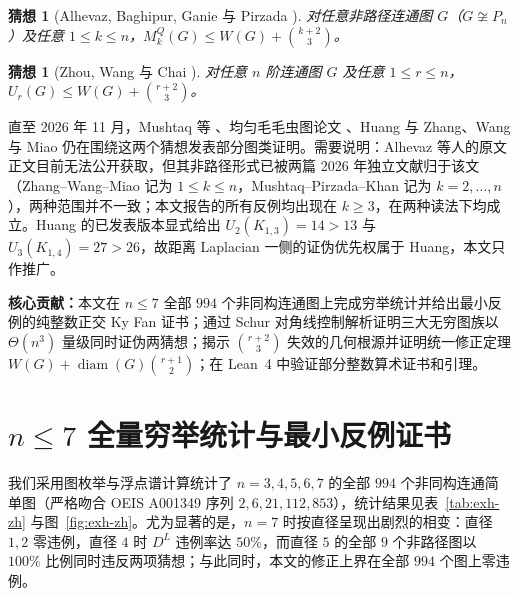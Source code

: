 \documentclass[11pt,a4paper]{article}
\newcommand{\takeaway}[2]{%
  \vspace{6pt}\noindent\colorbox{primary!8}{%
    \parbox{\dimexpr\linewidth-2\fboxsep\relax}{%
      \vspace{3pt}\textbf{\color{primary}#1：}\hspace{0.5em}#2\vspace{3pt}%
    }%
  }\vspace{6pt}%
}
\newtheorem{conjecture}[theorem]{猜想}
\theoremstyle{remark}
\DeclareMathOperator{\diam}{diam}
\begin{document}
\begin{conjecture}[Alhevaz, Baghipur, Ganie 与 Pirzada \cite{ABGP2021}]\label{conj:DQ-zh}
对任意非路径连通图 $G$（$G \not\cong P_n$）及任意 $1 \le k \le n$，$M_k^Q(G) \le W(G) + \binom{k+2}{3}$。
\end{conjecture}

\begin{conjecture}[Zhou, Wang 与 Chai \cite{ZWC2025}]\label{conj:DL-zh}
对任意 $n$ 阶连通图 $G$ 及任意 $1 \le r \le n$，$U_r(G) \le W(G) + \binom{r+2}{3}$。
\end{conjecture}

直至 2026 年 11 月，Mushtaq 等 \cite{MPK2026}、均匀毛毛虫图论文 \cite{Caterpillar2026}、Huang \cite{Huang2026} 与 Zhang、Wang 与 Miao \cite{ZW2026} 仍在围绕这两个猜想发表部分图类证明。需要说明：Alhevaz 等人的原文正文目前无法公开获取，但其非路径形式已被两篇 2026 年独立文献归于该文（Zhang--Wang--Miao 记为 $1\le k\le n$，Mushtaq--Pirzada--Khan 记为 $k=2,\dots,n$），两种范围并不一致；本文报告的所有反例均出现在 $k\ge 3$，在两种读法下均成立。Huang 的已发表版本显式给出 $U_2(K_{1,3})=14>13$ 与 $U_3(K_{1,4})=27>26$，故距离 Laplacian 一侧的证伪优先权属于 Huang，本文只作推广。

\takeaway{核心贡献}{本文在 $n\le 7$ 全部 $994$ 个非同构连通图上完成穷举统计并给出最小反例的纯整数正交 Ky Fan 证书；通过 Schur 对角线控制解析证明三大无穷图族以 $\Theta(n^3)$ 量级同时证伪两猜想；揭示 $\binom{r+2}{3}$ 失效的几何根源并证明统一修正定理 $W(G)+\diam(G)\binom{r+1}{2}$；在 Lean~4 中验证部分整数算术证书和引理。}

\section{$n \le 7$ 全量穷举统计与最小反例证书}
我们采用图枚举与浮点谱计算统计了 $n=3,4,5,6,7$ 的全部 $994$ 个非同构连通简单图（严格吻合 OEIS A001349 序列 $2,6,21,112,853$），统计结果见表~\ref{tab:exh-zh} 与图~\ref{fig:exh-zh}。尤为显著的是，$n=7$ 时按直径呈现出剧烈的相变：直径 $1,2$ 零违例，直径 $4$ 时 $D^L$ 违例率达 $50\%$，而直径 $5$ 的全部 $9$ 个非路径图以 $100\%$ 比例同时违反两项猜想；与此同时，本文的修正上界在全部 $994$ 个图上零违例。

\begin{table}[!htbp]
\centering
\caption{$n \le 7$ 全部 $994$ 个非同构连通图的全量统计结果。}
\label{tab:exh-zh}
\end{table}
\end{document}
